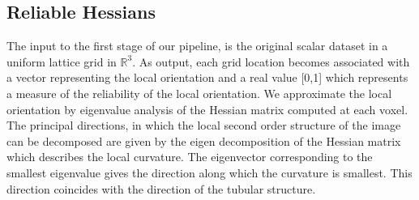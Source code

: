 \subsection {Reliable Hessians}
\label{subsec:rh}

The input to the first stage of our pipeline, is the original scalar dataset in a uniform lattice grid in $\mathbb{R}^3$. As output, each grid location becomes associated with a vector representing the local orientation and a real value [0,1] which represents a measure of the reliability of the local orientation. We approximate the local orientation by eigenvalue analysis of the Hessian matrix computed at each voxel. The principal directions, in which the local second order structure of the image can be decomposed are given by the eigen decomposition of the Hessian matrix which describes the local curvature.
The eigenvector corresponding to the smallest eigenvalue gives the direction along which the curvature is smallest. This direction coincides with the direction of the tubular structure.

